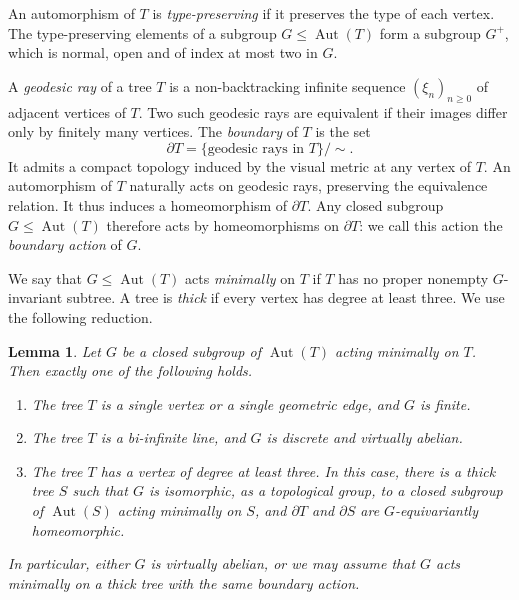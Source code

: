 \documentclass[11pt]{amsart}
\numberwithin{equation}{section}
\DeclareMathOperator{\Aut}{Aut}
\newtheorem{Lem}[The]{Lemma}
\theoremstyle{definition}
\begin{document}
An automorphism of $T$ is \emph{type-preserving} if it preserves the type of each vertex. The type-preserving elements of a subgroup $G\leq\Aut(T)$ form a subgroup $G^+$, which is normal, open and of index at most two in $G$.



A \emph{geodesic ray} of a tree $T$ is a non-backtracking infinite sequence $(\xi_n)_{n\geq 0}$ of adjacent vertices of $T$. Two such geodesic rays are equivalent if their images differ only by finitely many vertices. The \emph{boundary} of $T$ is the set 
$$\partial T=\{\text{geodesic rays in }T\}/\sim.$$
It admits a compact topology induced by the visual metric at any vertex of $T$. An automorphism of $T$ naturally acts on geodesic rays, preserving the equivalence relation. It thus induces a homeomorphism of $\partial T$. Any closed subgroup $G\leq \Aut(T)$ therefore acts by homeomorphisms on $\partial T$: we call this action the \emph{boundary action} of $G$.

We say that $G\leq \Aut(T)$ acts \emph{minimally} on $T$ if $T$ has no proper nonempty $G$-invariant subtree. A tree is \emph{thick} if every vertex has degree at least three. We use the following reduction.

\begin{Lem}
    \label{lem:tree-thick-reduction}
    Let $G$ be a closed subgroup of $\Aut(T)$ acting minimally on $T$. Then exactly one of the following holds.
    \begin{enumerate}[\rm (i)]
        \item\label{it:tree-finite} The tree $T$ is a single vertex or a single geometric edge, and $G$ is finite.
        \item\label{it:tree-line} The tree $T$ is a bi-infinite line, and $G$ is discrete and virtually abelian.
        \item\label{it:tree-thick} The tree $T$ has a vertex of degree at least three. In this case, there is a thick tree $S$ such that $G$ is isomorphic, as a topological group, to a closed subgroup of $\Aut(S)$ acting minimally on $S$, and $\partial T$ and $\partial S$ are $G$-equivariantly homeomorphic.
    \end{enumerate}
    In particular, either $G$ is virtually abelian, or we may assume that $G$ acts minimally on a thick tree with the same boundary action.
\end{Lem}
\end{document}
